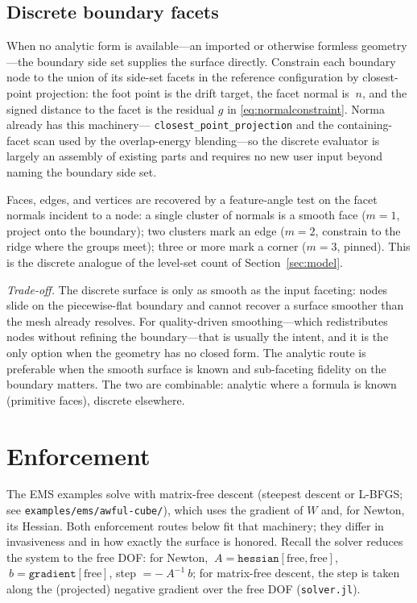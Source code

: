 \documentclass[11pt]{article}
\newcommand{\code}[1]{\texttt{#1}}
\begin{document}
\subsection{Discrete boundary facets}
\label{sec:discrete}

When no analytic form is available---an imported or otherwise formless
geometry---the boundary side set supplies the surface directly. Constrain each
boundary node to the union of its side-set facets in the reference
configuration by closest-point projection: the foot point is the drift target,
the facet normal is $~n$, and the signed distance to the facet is the residual
$g$ in \eqref{eq:normalconstraint}. Norma already has this machinery---
\code{closest\_point\_projection} and the containing-facet scan used by the
overlap-energy blending---so the discrete evaluator is largely an assembly of
existing parts and requires no new user input beyond naming the boundary side
set.

Faces, edges, and vertices are recovered by a feature-angle test on the facet
normals incident to a node: a single cluster of normals is a smooth face
($m=1$, project onto the boundary); two clusters mark an edge ($m=2$, constrain
to the ridge where the groups meet); three or more mark a corner ($m=3$,
pinned). This is the discrete analogue of the level-set count of
Section~\ref{sec:model}.

\emph{Trade-off.} The discrete surface is only as smooth as the input faceting:
nodes slide on the piecewise-flat boundary and cannot recover a surface smoother
than the mesh already resolves. For quality-driven smoothing---which
redistributes nodes without refining the boundary---that is usually the intent,
and it is the only option when the geometry has no closed form. The analytic
route is preferable when the smooth surface is known and sub-faceting fidelity
on the boundary matters. The two are combinable: analytic where a formula is
known (primitive faces), discrete elsewhere.

\section{Enforcement}
\label{sec:enforcement}

The EMS examples solve with matrix-free descent (steepest descent or L-BFGS;
see \code{examples/\allowbreak ems/\allowbreak awful-cube/}), which uses the gradient of $W$ and, for
Newton, its Hessian. Both enforcement routes below fit that machinery; they
differ in invasiveness and in how exactly the surface is honored. Recall the
solver reduces the system to the free DOF: for Newton,
$~A = \code{hessian}[\text{free},\text{free}]$,
$~b = \code{gradient}[\text{free}]$, step $= -~A^{-1}~b$; for matrix-free
descent, the step is taken along the (projected) negative gradient over the
free DOF (\code{solver.jl}).
\end{document}

